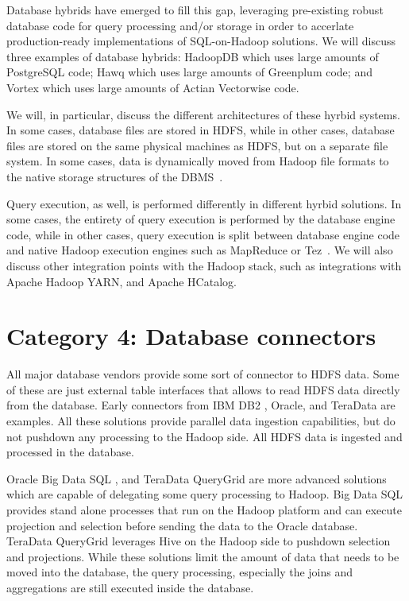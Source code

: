 \documentclass{vldb}
\begin{document}
Database hybrids have emerged to fill this gap, leveraging
pre-existing robust database code for query processing and/or storage
in order to accerlate production-ready implementations of
SQL-on-Hadoop solutions. We will discuss three examples of database
hybrids: HadoopDB \cite{hadoopdb} which uses large amounts of
PostgreSQL code; Hawq \cite{hawq} which uses large amounts of
Greenplum code; and Vortex \cite{vortex} which uses large amounts of Actian
Vectorwise code. 

We will, in particular, discuss the different architectures of these
hyrbid systems. In some cases, database files are stored in HDFS,
while in
other cases, database files are stored on the same physical machines
as HDFS, but on a separate file system. In some cases, data is
dynamically moved from Hadoop file formats to the native storage
structures of the DBMS~\cite{invisible-loading}.

Query execution, as well, is performed differently in different hyrbid
solutions. In some cases,
the entirety of 
query execution is performed by the database engine code, while in
other cases, query execution is split between database engine code and
native Hadoop execution engines such as MapReduce or Tez~\cite{split-execution}. We will also
discuss other integration points with the Hadoop stack, such as
integrations with Apache Hadoop YARN, and Apache HCatalog.

\section{Category 4: Database connectors}

All major database vendors provide some sort of connector to HDFS data. Some of these are just external table interfaces that allows to read HDFS data directly from the database. Early connectors from IBM DB2 \cite{ibm-sigmod2011}, Oracle, and TeraData are examples.
All these solutions provide parallel data ingestion capabilities, but do not pushdown any processing to the Hadoop side. All HDFS data is ingested and processed in the database.

Oracle Big Data SQL \cite{bigdataSQL}, and TeraData QueryGrid \cite{queryGrid} are more advanced solutions which are capable of delegating some query processing to Hadoop. Big Data SQL provides stand alone processes that run on the Hadoop platform and can execute projection and selection before sending the data to the Oracle database. TeraData QueryGrid leverages Hive on the Hadoop side to pushdown selection and projections. While these solutions limit the amount of data that needs to be moved into the database, the query processing, especially the joins and aggregations are still executed inside the database.
\end{document}
